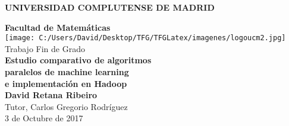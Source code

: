 
\begin{titlepage}
  \begin{center}
    \vspace*{1cm}
    \Huge
    \textbf{UNIVERSIDAD COMPLUTENSE DE MADRID}\\
    \vspace{0.8cm}
    \LARGE

    \textbf{Facultad de Matemáticas}\\
    \vspace{0.5cm}
    \vspace{0.5cm} 
    \texttt{[image: C:/Users/David/Desktop/TFG/TFGLatex/imagenes/logoucm2.jpg]} \\

    Trabajo Fin de Grado\\
    \vspace{0.8cm}
    \Huge
    \textbf{Estudio comparativo de algoritmos}\\
    \textbf{paralelos de machine learning}\\
    \textbf{e implementación en Hadoop}\\
    \vfill
    \LARGE
    \vspace{1cm}
    \textbf{David Retana Ribeiro}\\
    \vspace{0.5cm}
    Tutor, Carlos Gregorio Rodríguez\\
    \vspace{0.5cm}
    \Large
    3 de Octubre de 2017 
  \end{center}
\end{titlepage}

